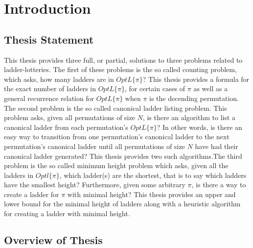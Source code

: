 



\chapter{Introduction}
\label{chapter:intro}



\section{Thesis Statement}
    This thesis provides three full, or partial, solutions to three problems related 
    to ladder-lotteries. The first of these problems is the so called counting problem, 
    which asks, how many ladders are in $OptL\{\pi\}$? This thesis provides 
    a formula for the exact number of ladders in $OptL\{\pi\}$, for certain 
    cases of $\pi$ as well as a general recurrence relation for $OptL\{\pi\}$
    when $\pi$ is the decending permutation. The second problem is the so called canonical ladder listing problem. 
    This problem asks, given all permutations of size $N$, is there an algorithm 
    to list a canonical ladder from each permutation's $OptL\{\pi\}$? In other words, 
    is there an easy way to transition from one permutation's canonical ladder to the next 
    permutation's canonical ladder until all permutations of size $N$ have had their canonical 
    ladder generated? This thesis provides two such algorithms.The third problem is the so called minimum height 
    problem which asks, given all the ladders in $Optl\{\pi\}$, which ladder(s) are 
    the shortest, that is to say which ladders have the smallest height? Furthermore, given some arbitrary $\pi$, 
    is there a way to create a ladder for $\pi$ with minimal height? This thesis 
    provides an upper and lower bound for the minimal height of ladders along with a heuristic algorithm 
    for creating a ladder with minimal height.
   
\section{Overview of Thesis}  

